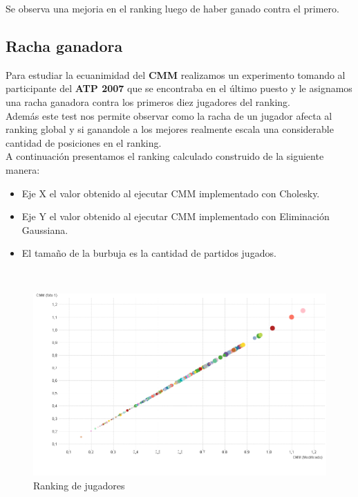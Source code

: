Se observa una mejoria en el ranking luego de haber ganado contra el primero.
\\



\subsection{Racha ganadora}

Para estudiar la ecuanimidad del \textbf{CMM} realizamos un experimento tomando al participante del \textbf{ATP 2007} que se encontraba en el último puesto y le asignamos una racha ganadora contra los primeros diez jugadores del ranking. \\

Además este test nos permite observar como la racha de un jugador afecta al ranking global y si ganandole a los mejores realmente escala una considerable cantidad de posiciones en el ranking. \\

A continuación presentamos el ranking calculado construido de la siguiente manera: \\

\begin{itemize}
	\item Eje X el valor obtenido al ejecutar CMM implementado con Cholesky.
	\item Eje Y el valor obtenido al ejecutar CMM implementado con Eliminación Gaussiana.
	\item El tamaño de la burbuja es la cantidad de partidos jugados.
\end{itemize}

\\

\begin{figure}[H]
\centering
\includegraphics[width=1\textwidth]{IMG/comparativa cmm -cmm foto 0.png}
\caption{Ranking de jugadores}
\label{fig:Ranking de jugadores}
\end{figure}

